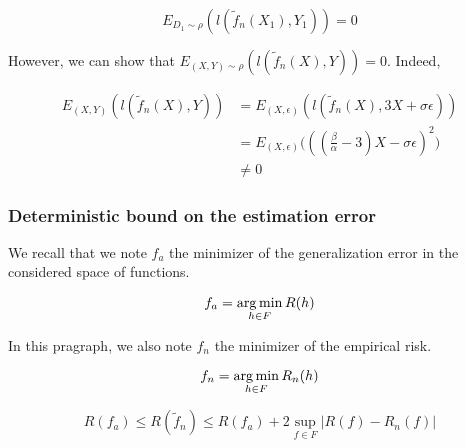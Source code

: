 \documentclass[
10pt, %
a4paper, %
oneside, %
headinclude,footinclude, %
BCOR5mm, %
]{scrartcl}
\begin{document}
    \begin{equation}
	E_{D_1\sim \rho}(l( \tilde{f}_n(X_1), Y_1))=0
    \end{equation}

    However, we can show that $E_{(X,Y)\sim \rho}(l( \tilde{f}_n(X), Y))=0$. Indeed,

    \begin{equation*}
        \begin{aligned}
            \label{eq:}
	    E_{(X,Y)}(l( \tilde{f}_n(X), Y))&=E_{(X,\epsilon)}(l( \tilde{f}_n(X), 3X+\sigma\epsilon))\\
            &=E_{(X,\epsilon)}\big(( (\frac{\beta}{\alpha} - 3)X-\sigma\epsilon)^2\big)\\
            &\neq 0
        \end{aligned}
    \end{equation*}


    \subsubsection{\large\color{Periwinkle}Deterministic bound on the estimation error}

We recall that we note $f_a$ the minimizer of the generalization error in the
considered space of functions.

    \begin{equation}
        f_a = \operatorname*{arg\,min}_{h\in F}R(h)
    \end{equation}

    In this pragraph, we also note $f_n$ the minimizer of the empirical risk.

    \begin{equation}
        f_n = \operatorname*{arg\,min}_{h\in F}R_n(h)
    \end{equation}

    \begin{proposition}
	\label{prop:dilemma}
	\begin{equation}
	    R(f_a)\leq R( \tilde{f}_n)\leq R(f_a)+2 \sup_{f\in F}|R(f)- R_n(f)|
	\end{equation}
    \end{proposition}
\end{document}

